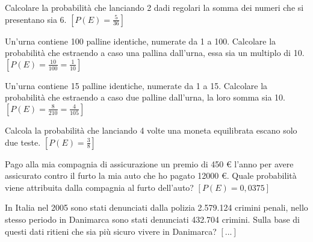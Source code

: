 \begin{esercizio}[\Ast]
 \label{ese:9.13}
Calcolare la probabilità che lanciando 2 dadi regolari la somma dei numeri che 
si presentano sia 6.
\hfill $\left[P(E)=\frac 5{36}\right]$
\end{esercizio}

\begin{esercizio}[\Ast]
 \label{ese:9.14}
Un'urna contiene 100 palline identiche, numerate da 1 a 100. Calcolare la 
probabilità che estraendo a caso una pallina dall'urna, essa sia un multiplo di 
10.
\hfill $\left[P(E)=\frac{10}{100}=\frac 1{10}\right]$
\end{esercizio}

\begin{esercizio}[\Ast]
 \label{ese:9.15}
Un'urna contiene 15 palline identiche, numerate da 1 a 15. Calcolare la 
probabilità che estraendo a caso due palline dall'urna, la loro somma sia 10.
\hfill $\left[P(E)=\frac 8{210}=\frac 4{105}\right]$
\end{esercizio}

\begin{esercizio}[\Ast]
 \label{ese:9.16}
Calcola la probabilità che lanciando 4 volte una moneta equilibrata escano solo 
due teste.
\hfill $\left[P(E)=\frac 3 8\right]$
\end{esercizio}

\begin{esercizio}[\Ast]
 \label{ese:9.17}
Pago alla mia compagnia di assicurazione un premio di 450 € l'anno per avere 
assicurato contro il furto la mia auto che ho pagato 12000 €. Quale probabilità 
viene attribuita dalla compagnia al furto dell'auto?
\hfill $\left[P(E)=0,0375\right]$
\end{esercizio}
% 

\begin{esercizio}
 \label{ese:9.19}
In Italia nel 2005 sono stati denunciati dalla polizia 2.579.124 crimini penali, 
nello stesso periodo in Danimarca sono stati denunciati 432.704 crimini. Sulla 
base di questi dati ritieni che sia più sicuro vivere in Danimarca?
\hfill $\left[...\right]$
\end{esercizio}

